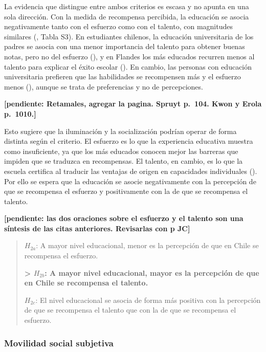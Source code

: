 \documentclass[
  spanish,
  a4paper,
  oneside]{scrbook}
\begin{document}
La evidencia que distingue entre ambos criterios es escasa y no apunta
en una sola dirección. Con la medida de recompensa percibida, la
educación se asocia negativamente tanto con el esfuerzo como con el
talento, con magnitudes similares
(, Tabla S3). En estudiantes chilenos, la educación universitaria de
los padres se asocia con una menor importancia del talento para obtener
buenas notas, pero no del esfuerzo
(), y en Flandes los
más educados recurren menos al talento para explicar el éxito escolar
(). En cambio, las personas con educación universitaria
prefieren que las habilidades se recompensen más y el esfuerzo menos
(), aunque
se trata de preferencias y no de percepciones.

\textbf{{[}pendiente: Retamales, agregar la pagina. Spruyt p.~104. Kwon
y Erola p.~1010.{]}}

Esto sugiere que la iluminación y la socialización podrían operar de
forma distinta según el criterio. El esfuerzo es lo que la experiencia
educativa muestra como insuficiente, ya que los más educados conocen
mejor las barreras que impiden que se traduzca en recompensas. El
talento, en cambio, es lo que la escuela certifica al traducir las
ventajas de origen en capacidades individuales
().
Por ello se espera que la educación se asocie negativamente con la
percepción de que se recompensa el esfuerzo y positivamente con la de
que se recompensa el talento.

\textbf{{[}pendiente: las dos oraciones sobre el esfuerzo y el talento
son una síntesis de las citas anteriores. Revisarlas con p JC{]}}

\begin{quote}
\(H_{2a}\): A mayor nivel educacional, menor es la percepción de que en
Chile se recompensa el esfuerzo.

\textbf{\textgreater{} \(H_{2b}\): A mayor nivel educacional, mayor es
la percepción de que en Chile se recompensa el talento.}

\(H_{2c}\): El nivel educacional se asocia de forma más positiva con la
percepción de que se recompensa el talento que con la de que se
recompensa el esfuerzo.
\end{quote}

\subsubsection{Movilidad social
subjetiva}\label{movilidad-social-subjetiva}
\end{document}
